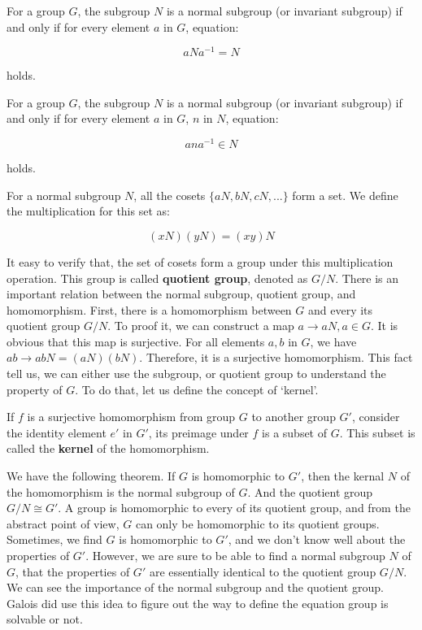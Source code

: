 \documentclass[b5paper]{article}
\begin{document}
\begin{theorem}
For a group $G$, the subgroup $N$ is a normal subgroup (or invariant subgroup) if and only if for every element $a$ in $G$, equation:

\[
aNa^{-1} = N
\]

holds.
\end{theorem}

\begin{theorem}
For a group $G$, the subgroup $N$ is a normal subgroup (or invariant subgroup) if and only if for every element $a$ in $G$, $n$ in $N$, equation:

\[
ana^{-1} \in N
\]

holds.
\end{theorem}

For a normal subgroup $N$, all the cosets $\{aN, bN, cN, ...\}$ form a set. We define the multiplication for this set as:

\[
(xN)(yN) = (xy)N
\]

It easy to verify that, the set of cosets form a group under this multiplication operation. This group is called \textbf{quotient group}, denoted as $G/N$. There is an important relation between the normal subgroup, quotient group, and homomorphism. First, there is a homomorphism between $G$ and every its quotient group $G/N$. To proof it, we can construct a map $a \to aN, a \in G$. It is obvious that this map is surjective. For all elements $a, b$ in $G$, we have $ab \to abN = (aN)(bN)$. Therefore, it is a surjective homomorphism. This fact tell us, we can either use the subgroup, or quotient group to understand the property of $G$. To do that, let us define the concept of `kernel'.

\begin{definition}
If $f$ is a surjective homomorphism from group $G$ to another group $G'$, consider the identity element $e'$ in $G'$, its preimage under $f$ is a subset of $G$. This subset is called the \textbf{kernel} of the homomorphism.
\end{definition}

We have the following theorem. If $G$ is homomorphic to $G'$, then the kernal $N$ of the homomorphism is the normal subgroup of $G$. And the quotient group $G/N \cong G'$. A group is homomorphic to every of its quotient group, and from the abstract point of view, $G$ can only be homomorphic to its quotient groups. Sometimes, we find $G$ is homomorphic to $G'$, and we don't know well about the properties of $G'$. However, we are sure to be able to find a normal subgroup $N$ of $G$, that the properties of $G'$ are essentially identical to the quotient group $G/N$. We can see the importance of the normal subgroup and the quotient group. Galois did use this idea to figure out the way to define the equation group is solvable or not.
\end{document}
